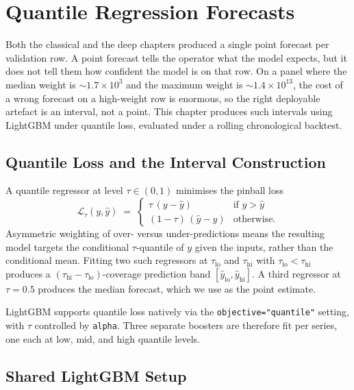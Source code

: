\section{Quantile Regression Forecasts}
\label{sec:quantile}

Both the classical and the deep chapters produced a single point forecast per validation row. A point forecast tells the operator what the model expects, but it does not tell them how confident the model is on that row. On a panel where the median weight is $\sim\!1.7\!\times\!10^{3}$ and the maximum weight is $\sim\!1.4\!\times\!10^{13}$, the cost of a wrong forecast on a high-weight row is enormous, so the right deployable artefact is an interval, not a point. This chapter produces such intervals using LightGBM under quantile loss, evaluated under a rolling chronological backtest.

\subsection{Quantile Loss and the Interval Construction}
\label{sec:quantile:loss}

A quantile regressor at level $\tau \in (0, 1)$ minimises the pinball loss
\begin{equation}
  \mathcal{L}_\tau(y, \hat y) \;=\; \begin{cases}
    \tau \,(y - \hat y) & \text{if } y > \hat y \\
    (1 - \tau)\,(\hat y - y) & \text{otherwise.}
  \end{cases}
\end{equation}
Asymmetric weighting of over- versus under-predictions means the resulting model targets the conditional $\tau$-quantile of $y$ given the inputs, rather than the conditional mean. Fitting two such regressors at $\tau_{\text{lo}}$ and $\tau_{\text{hi}}$ with $\tau_{\text{lo}} < \tau_{\text{hi}}$ produces a $(\tau_{\text{hi}} - \tau_{\text{lo}})$-coverage prediction band $[\hat y_{\text{lo}}, \hat y_{\text{hi}}]$. A third regressor at $\tau = 0.5$ produces the median forecast, which we use as the point estimate.

LightGBM supports quantile loss natively via the \texttt{objective="quantile"} setting, with $\tau$ controlled by \texttt{alpha}. Three separate boosters are therefore fit per series, one each at low, mid, and high quantile levels.

\subsection{Shared LightGBM Setup}
\label{sec:quantile:setup}

